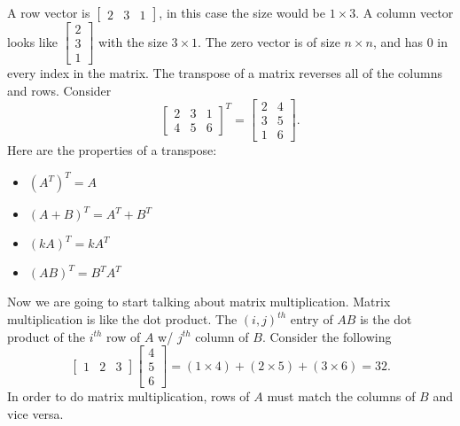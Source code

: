 A row vector is $\begin{bmatrix} 2&3&1 \end{bmatrix} $, in this case the size would be $1\times 3$. A column vector looks like $\begin{bmatrix} 2\\3\\1 \end{bmatrix} $ with the size $3\times 1$. The zero vector is of size $n\times n$, and has $0$ in every index in the matrix. The transpose of a matrix reverses all of the columns and rows. Consider
\[
  \begin{bmatrix} 2&3&1\\4&5&6 \end{bmatrix} ^{T}=\begin{bmatrix} 2&4\\3&5\\1&6 \end{bmatrix} 
.\] 
Here are the properties of a transpose:
\begin{itemize}
  \item $\left( A^{T} \right)^{T}=A $
  \item $\left( A+B \right) ^{T}=A^{T}+B^{T}$
  \item $(kA)^{T}=kA^{T}$
  \item $\left( AB \right) ^{T}=B^{T}A^{T}$
\end{itemize}
Now we are going to start talking about matrix multiplication. Matrix multiplication is like the dot product. The $(i,j)^{th}$ entry of $AB$ is the dot product of the $i^{th}$ row of $A$ w/ $j^{th}$ column of $B$. Consider the following
\[
  \begin{bmatrix} 1&2&3 \end{bmatrix} \begin{bmatrix} 4\\5\\6 \end{bmatrix} =(1\times 4)+(2\times 5)+(3\times 6)= 32
.\] 
In order to do matrix multiplication, rows of $A$ must match the columns of $B$ and vice versa.
